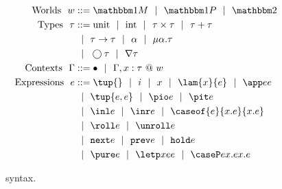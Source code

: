 
\begin{figure}
\begin{abstrsyn}
\[\begin{aligned}
\text{Worlds}\ \ 
\world &::= \bbonem \gbar \bbonep \gbar \bbtwo  \\
%
\text{Types}\ \ 
\type &::= \text{unit}\gbar\text{int}%
 \gbar \type \times \type
 \gbar \type + \type \\
&\gbar \type \to \type
 \gbar \alpha \gbar \mu \alpha.\tau \\
&\gbar \fut \type 
 \gbar \curr \type \\
%
\text{Contexts}\ \ 
\context &::=\emptyC
 \gbar \context, x:\tau~@~w \\
%
\text{Expressions}\ \ 
\expr &::= \tup{}\gbar\inte\gbar\var%
 \gbar \lam {\var}{\expr} 
 \gbar \app \expr \expr \\
&\gbar \tup{\expr, \expr} 
 \gbar \pio \expr 
 \gbar \pit \expr \\
&\gbar \inl \expr 
 \gbar \inr \expr
 \gbar \caseof {\expr}{\var.\expr}{\var.\expr}
\\ %
&\gbar \roll e
 \gbar \unroll e\\
&\gbar \next \expr 
 \gbar \prev \expr 
 \gbar \pause \expr \\
&\gbar \pure \expr 
 \gbar \letp \var \expr \expr
 \gbar \caseP \expr {\var.\expr} {\var.\expr} \\
\end{aligned}\]
\end{abstrsyn}
\caption{\lang~syntax.}
\label{fig:grammar}
\end{figure}
